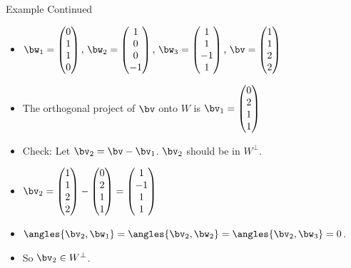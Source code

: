\documentclass{beamer}
\begin{document}
\begin{frame}{Example Continued}
\begin{itemize}
\item $
\bw_1=
\begin{pmatrix}
0  \\
1  \\
1\\
0
\end{pmatrix}
\text{, }
\bw_2=
\begin{pmatrix}
1 \\
0\\
0 \\
-1
\end{pmatrix}
\text{, }
\bw_3=
\begin{pmatrix}
1 \\
1 \\
-1 \\
1
\end{pmatrix}
\text{, }
\bv=
\begin{pmatrix}
1 \\
1 \\
2 \\
2
\end{pmatrix}
$
\item The orthogonal project of $\bv$ onto $W$ is $\bv_1=
\begin{pmatrix}
0 \\
2 \\
1 \\
1
\end{pmatrix}
$
\item Check: Let $\bv_2 = \bv - \bv_1$. $\bv_2$ should be in $W^{\perp}$.
\item $\bv_2=
\begin{pmatrix}
1 \\
1 \\
2 \\
2
\end{pmatrix}
-
\begin{pmatrix}
0 \\
2 \\
1 \\
1
\end{pmatrix}
=
\begin{pmatrix}
1 \\
-1 \\
1 \\
1
\end{pmatrix}
$
\item $\angles{\bv_2,\bw_1}=\angles{\bv_2,\bw_2}=\angles{\bv_2,\bw_3} = 0$.
\item So $\bv_2\in W^{\perp}$.
\end{itemize}
\end{frame}
\end{document}
